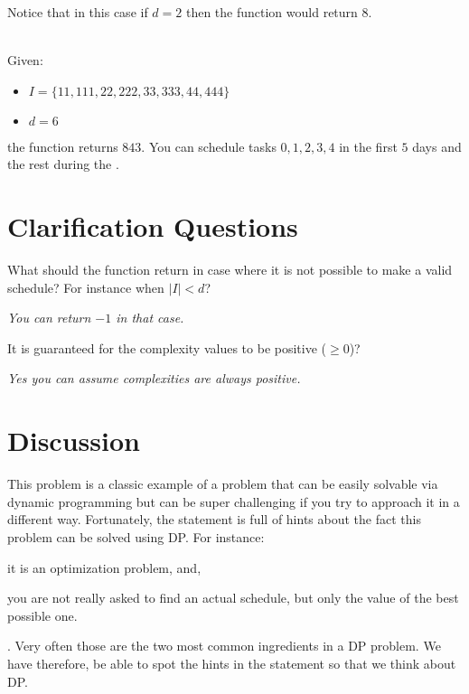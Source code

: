 \begin{exercise}
\begin{example}
		Notice that in this case if $d = 2$ then the function would return $8$.
	\end{example}

	\begin{example}
		\hfill \\
		Given:
		\begin{itemize}
			\item $I = \{11,111,22,222,33,333,44,444\}$
			\item $d = 6$
		\end{itemize}
		the function returns $843$. You can schedule tasks $0,1,2,3,4$ in the first $5$ days and the
		rest during the .
		
	\end{example}
\end{exercise}



\section{Clarification Questions}
		
	\begin{QandA}
			\item What should the function return in case where it is not possible to make a valid
			schedule? For instance when $|I| < d$?
		\begin{answered}
			\textit{You can return $-1$ in that case.}
		\end{answered}

		\item It is guaranteed for the complexity values to be positive ($\geq 0$)?
		\begin{answered}
			\textit{Yes you can assume complexities are always positive.}
		\end{answered}
	\end{QandA}

\section{Discussion}
\label{min_difficulty_job_scheduler:sec:discussion}
This problem is a classic example of  a problem that can be easily solvable via dynamic programming but can be super challenging if you try to approach it in a different way.
Fortunately, the statement is full of hints about the fact this problem can be solved using DP.
For instance:
\begin{enumerate*}
	\item it is an optimization problem, and,
	\item you are  not really asked to find an actual schedule, but only the value of the best possible one. 
\end{enumerate*}. Very often those are the two most common ingredients in a DP problem.
We have therefore, be able to spot the hints in the statement so that we think about DP.

